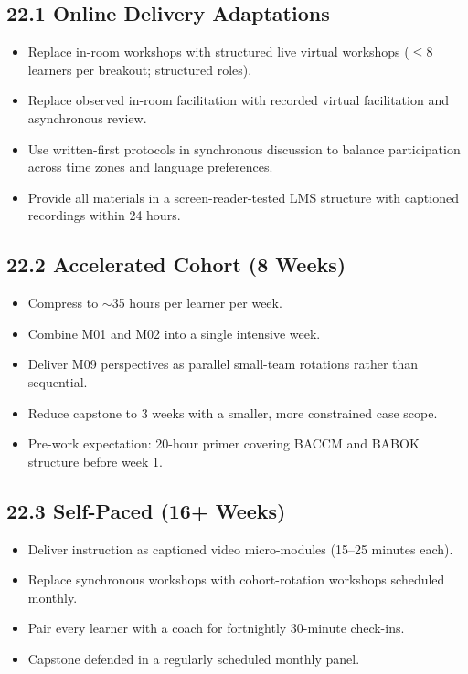 \documentclass[11pt,letterpaper,oneside]{report}
\begin{document}
\subsection*{22.1 Online Delivery Adaptations}
\begin{itemize}
  \item Replace in-room workshops with structured live virtual workshops ($\leq$8 learners per breakout; structured roles).
  \item Replace observed in-room facilitation with recorded virtual facilitation and asynchronous review.
  \item Use written-first protocols in synchronous discussion to balance participation across time zones and language preferences.
  \item Provide all materials in a screen-reader-tested LMS structure with captioned recordings within 24 hours.
\end{itemize}

\subsection*{22.2 Accelerated Cohort (8 Weeks)}
\begin{itemize}
  \item Compress to ${\sim}$35 hours per learner per week.
  \item Combine M01 and M02 into a single intensive week.
  \item Deliver M09 perspectives as parallel small-team rotations rather than sequential.
  \item Reduce capstone to 3 weeks with a smaller, more constrained case scope.
  \item Pre-work expectation: 20-hour primer covering BACCM and BABOK structure before week 1.
\end{itemize}

\subsection*{22.3 Self-Paced (16+ Weeks)}
\begin{itemize}
  \item Deliver instruction as captioned video micro-modules (15--25 minutes each).
  \item Replace synchronous workshops with cohort-rotation workshops scheduled monthly.
  \item Pair every learner with a coach for fortnightly 30-minute check-ins.
  \item Capstone defended in a regularly scheduled monthly panel.
\end{itemize}
\end{document}
